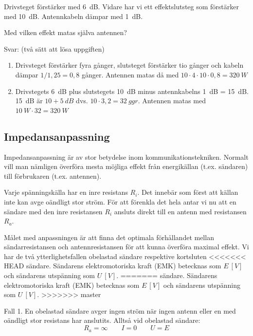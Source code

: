 Drivsteget förstärker med \SI{6}{dB}. Vidare har vi ett effektslutsteg som 
förstärker med \SI{10}{dB}. Antennkabeln dämpar med \SI{1}{dB}.

Med vilken effekt matas själva antennen?

Svar: (två sätt att lösa uppgiften)

\begin{enumerate}
\item Drivsteget förstärker fyra gånger, slutsteget förstärker tio gånger och
kabeln dämpar \(1/1,25 = 0,8\) gånger. Antennen matas då med
\(10 \cdot 4 \cdot 10 \cdot 0,8 = \SI{320}{W}\)

\item Drivstegets 6~dB plus slutstegets 10~dB minus antennkabelns 1~dB = 15~dB.
15~dB är \(10 + \SI{5}{dB}\) dvs. \(10 \cdot 3,2 = \SI{32}{ggr}\). Antennen 
matas med \(\SI{10}{W} \cdot 32 = \SI{320}{W}\)
\end{enumerate}

\subsection{Impedansanpassning}

Impedansanpassning är av stor betydelse inom kommunikationstekniken.
Normalt vill man nämligen överföra mesta möjliga effekt från energikällan
(t.ex. sändaren) till förbrukaren (t.ex. antennen).

Varje spänningskälla har en inre resistans \(R_i\). Det innebär som först att
källan inte kan avge oändligt stor ström.
För att förenkla det hela antar vi nu att en sändare med den inre resistansen
\(R_i\) ansluts direkt till en antenn med resistansen \(R_a\).

Målet med anpassningen är att finna det optimala förhållandet mellan
sändarresistansen och antennresistansen för att kunna överföra maximal effekt.
Vi har de två ytterlighetsfallen obelastad sändare respektive kortsluten
<<<<<<< HEAD
sändare. Sändarens elektromotoriska kraft (EMK) betecknas som \(E\ [\unit{V}]\) 
och sändarens utspänning som \(U\ [\unit{V}]\).
=======
sändare.
Sändarens elektromotoriska kraft (EMK) betecknas som \(E\ [V]\) och sändarens
utspänning som \(U\ [V]\).
>>>>>>> master

Fall 1.
En obelastad sändare avger ingen ström när ingen antenn eller en med oändligt
stor resistans har anslutits.
Alltså vid obelastad sändare:
\[   	R_a = \infty \qquad I = 0 \qquad U = E   \]

